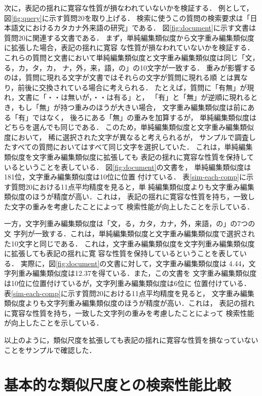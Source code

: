次に，表記の揺れに寛容な性質が損なわれていないかを検証する．
例として，図\ref{fig:query}に示す質問20を取り上げる．
検索に使うこの質問の検索要求は「日本語文におけるカタカナ外来語の研究」である．
図\ref{fig:document}に示す文書は質問20に関連する文書である．
まず，単純編集類似度から文字重み編集類似度に拡張した場合，表記の揺れに寛容
な性質が損なわれていないかを検証する．
これらの質問と文書において単純編集類似度と文字重み編集類似度は同じ「文，る，カ，タ，カ，
ナ，外，来，語，の」の10文字が一致する．
重みが影響するのは，質問に現れる文字が文書ではそれらの文字が質問に現れる順
とは異なり，前後に交換されている場合に考えられる．
たとえば，質問に「有無」が現れ，文書に「・・は無いが，・・は有る」と，
「有」と「無」が逆順に現れるとき，もし「無」が持つ重みのほうが大きい場合，
文字重み編集類似度は前にある「有」ではなく，
後ろにある「無」の重みを加算するが，
単純編集類似度はどちらを選んでも同じである．
このため，単純編集類似度と文字重み編集類似度において，
稀に選択された文字が異なると考えられるが，
サンプルで調査したすべての質問においてはすべて同じ文字を選択していた．
これは，単純編集類似度を文字重み編集類似度に拡張しても
表記の揺れに寛容な性質を保持しているということを表している．
図\ref{fig:document}の文書を，
単純編集類似度は181位，文字重み編集類似度は10位に位置
付けている．
表\ref{sim-each-comp}に示す質問20における11点平均精度を見ると，単
純編集類似度よりも文字重み編集類似度のほうが精度が高い．これは，
表記の揺れに寛容な性質を持ち，一致した文字の重みを考慮したことによって
検索性能が向上したことを示している．

一方，文字列重み編集類似度は「文，る，カタ，カナ，外，来語，の」の7つの文
字列が一致する．これは，単純編集類似度と文字重み編集類似度で選択され
た10文字と同じである．
これは，文字重み編集類似度を文字列重み編集類似度に拡張しても表記の揺れに寛
容な性質を保持しているということを表している．
実際に，図\ref{fig:document}の文書に対して，文字重み編集類似度は
4.44，文字列重み編集類似度は12.37を得ている．また，この文書を
文字重み編集類似度は10位に位置付けているが，文字列重み編集類似度は6位に
位置付けている．
表\ref{sim-each-comp}に示す質問20における11点平均精度を見ると，
文字重み編集類似度よりも文字列重み編集類似度のほうが精度が高い．これは，
表記の揺れに寛容な性質を持ち，一致した文字列の重みを考慮したことによって
検索性能が向上したことを示している．

以上のように，類似尺度を拡張しても表記の揺れに寛容な性質を損なっていない
ことをサンプルで確認した．

\section{基本的な類似尺度との検索性能比較} 

